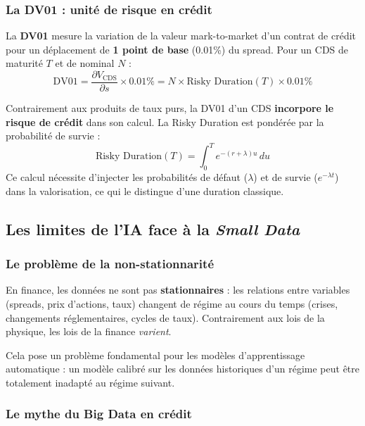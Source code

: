 \subsubsection{La DV01 : unité de risque en crédit}

\begin{definition}
La \textbf{DV01} mesure la variation de la valeur mark-to-market d'un contrat de crédit pour un déplacement de \textbf{1 point de base} (0.01\%) du spread. Pour un CDS de maturité $T$ et de nominal $N$ :
\[
\text{DV01} = \frac{\partial V_{\text{CDS}}}{\partial s} \times 0.01\% = N \times \text{Risky Duration}(T) \times 0.01\%
\]
\end{definition}

\begin{remarque}
Contrairement aux produits de taux purs, la DV01 d'un CDS \textbf{incorpore le risque de crédit} dans son calcul. La Risky Duration est pondérée par la probabilité de survie :
\[
\text{Risky Duration}(T) = \int_0^T e^{-(r+\lambda)u} \, du
\]
Ce calcul nécessite d'injecter les probabilités de défaut ($\lambda$) et de survie ($e^{-\lambda t}$) dans la valorisation, ce qui le distingue d'une duration classique.
\end{remarque}

\subsection{Les limites de l'IA face à la \textit{Small Data}}

\subsubsection{Le problème de la non-stationnarité}

En finance, les données ne sont pas \textbf{stationnaires} : les relations entre variables (spreads, prix d'actions, taux) changent de régime au cours du temps (crises, changements réglementaires, cycles de taux). Contrairement aux lois de la physique, les lois de la finance \textit{varient}.

Cela pose un problème fondamental pour les modèles d'apprentissage automatique : un modèle calibré sur les données historiques d'un régime peut être totalement inadapté au régime suivant.

\subsubsection{Le mythe du Big Data en crédit}

